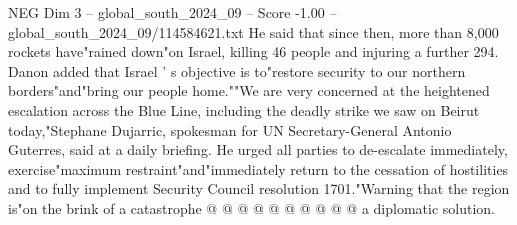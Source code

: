 \begin{textsample}{NEG Dim 3 – global\_south\_2024\_09 – Score -1.00 – global\_south\_2024\_09/114584621.txt}
He said that since then, more than 8,000 rockets have"rained down"on Israel, killing 46 people and injuring a further 294.
Danon added that Israel ' s objective is to"restore security to our northern borders"and"bring our people home.""We are very concerned at the heightened escalation across the Blue Line, including the deadly strike we saw on Beirut today,"Stephane Dujarric, spokesman for UN Secretary-General Antonio Guterres, said at a daily briefing.
He urged all parties to de-escalate immediately, exercise"maximum restraint"and"immediately return to the cessation of hostilities and to fully implement Security Council resolution 1701."Warning that the region is"on the brink of a catastrophe @ @ @ @ @ @ @ @ @ @ a diplomatic solution.

\end{textsample}
